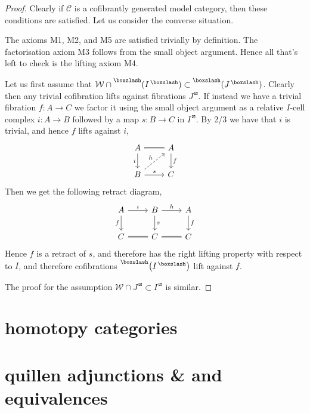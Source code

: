 \documentclass{amsart}
\theoremstyle{definition}
\begin{document}
  \begin{proof}
    Clearly if $\mathcal{C}$ is a cofibrantly generated model
    category, then these conditions are satisfied.
    Let us consider the converse situation.

    The axioms M1, M2, and M5 are satisfied trivially by definition.
    The factorisation axiom M3 follows from the small object argument.
    Hence all that's left to check is the lifting axiom M4.

    Let us first assume that 
    $\mathcal{W}\cap \prescript{\boxslash}{}{
        (I^{\,\boxslash})} \subset \prescript{\boxslash}{}{
        (J^{\,\boxslash})}$. Clearly then any trivial cofibration
      lifts against fibrations $J^{\,\boxslash}$.
      If instead we have a trivial fibration $f:A\to C$
      we factor it using the small object argument as
      a relative $I$-cell complex $i:A\to B$
      followed by a map $s:B\to C$
      in $I^{\,\boxslash}$. By 2/3 we have that
      $i$ is trivial, and hence $f$ lifts
      against $i$,
    \[
      \begin{tikzcd}
        A \arrow[d, "i"'] \arrow[r,equals]& A \arrow[d, "f"]\\
        B \arrow[r, "s"]
        \arrow[ur, dashed, "h"] & C
      \end{tikzcd}
    \]
    Then we get the following retract diagram,
    \[
      \begin{tikzcd}
        A \arrow[d, "f"'] \arrow[r,"i"]& B \arrow[d, "s"] \arrow[r,
        "h"]
        & A \arrow[d, "f"]\\
        C \arrow[r, equals] & C \arrow[r, equals] & C
      \end{tikzcd}
    \]
    Hence $f$ is a retract of $s$, and therefore has the
    right lifting property with respect to $I$, and therefore
    cofibrations $\prescript{\boxslash}{}{\left( I ^{\,\boxslash}\right)}$
    lift against $f$.

    The proof for the assumption
    $\mathcal{W}\cap J^{\,\boxslash}\subset I^{\,\boxslash}$ is similar.
  \end{proof}

  \section{homotopy categories}
  \section{quillen adjunctions \& and equivalences}
\end{document}
